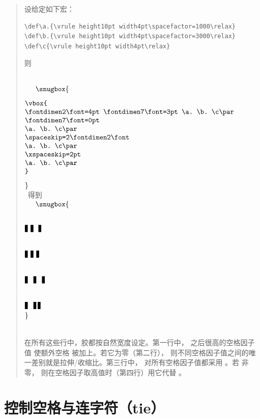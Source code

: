 \documentclass[a4paper]{rapport3}
\newenvironment{disp}{\begin{quotation}}{\end{quotation}}
\newenvironment{example}{\begin{quotation}}{\end{quotation}}
\begin{document}
\begin{example} 设给定如下宏：
\begin{verbatim}
\def\a.{\vrule height10pt width4pt\spacefactor=1000\relax}
\def\b.{\vrule height10pt width4pt\spacefactor=3000\relax}
\def\c{\vrule height10pt width4pt\relax}
\end{verbatim} 
    则


\hbox{%
$\vcenter{\snugbox{%
\begin{verbatim}
\vbox{
\fontdimen2\font=4pt % normal space 
\fontdimen7\font=3pt % extra space
\a. \b. \c\par
% zero extra space
\fontdimen7\font=0pt
\a. \b. \c\par
% set \spaceskip for normal space
\spaceskip=2\fontdimen2\font
\a. \b. \c\par
% set \xspaceskip
\xspaceskip=2pt
\a. \b. \c\par
}
\end{verbatim}
}}$%
%
\quad 得到\quad
%
%
$\vcenter{\snugbox{\parindent0pt\parskip=0pt
\def\a.{\vrule height10pt width4pt\spacefactor=1000\relax}
\def\b.{\vrule height10pt width4pt\spacefactor=3000\relax}
\def\c{\vrule height10pt width4pt\relax}
\leavevmode\strut\par\hbox{}\hbox{}
\fontdimen2\font=4pt \fontdimen7\font=3pt
\a. \b. \c\par \vskip2\baselineskip
\fontdimen7\font=0pt
\a. \b. \c\par \vskip2\baselineskip
\spaceskip=2\fontdimen2\font
\a. \b. \c\par \vskip2\baselineskip
\xspaceskip=2pt
\a. \b. \c\par \leavevmode\strut
}}$%
%
}

在所有这些行中，胶都按自然宽度设定。第一行中， 之后很高的空格因子值
使额外空格  被加上。若它为零（第二行），
则不同空格因子值之间的唯一差别就是拉伸/收缩比。第三行中，
对所有空格因子值都采用 。若  非零，
则在空格因子取高值时（第四行）用它代替 。
\end{example}

\section{控制空格与连字符（tie）}
\label{tie}
\end{document}

